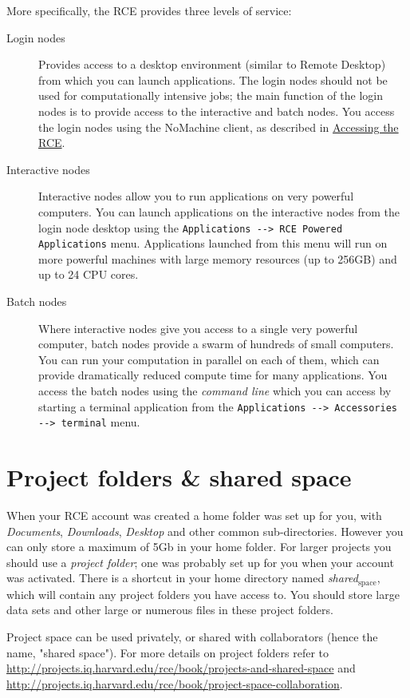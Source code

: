 \documentclass[11pt]{article}
\begin{document}
More specifically, the RCE provides three levels of service:
\begin{description}
\item[{Login nodes}] Provides access to a desktop environment (similar to Remote Desktop) from which you can launch applications. The login nodes should not be used for computationally intensive jobs; the main function of the login nodes is to provide access to the interactive and batch nodes. You access the login nodes using the NoMachine client, as described in \hyperref[sec:org16009a6]{Accessing the RCE}.
\item[{Interactive nodes}] Interactive nodes allow you to run applications on very powerful computers. You can launch applications on the interactive nodes from the login node desktop using the \texttt{Applications -{}-> RCE Powered Applications} menu. Applications launched from this menu will run on more powerful machines with large memory resources (up to 256GB) and up to 24 CPU cores.
\item[{Batch nodes}] Where interactive nodes give you access to a single very powerful computer, batch nodes provide a swarm of hundreds of small computers. You can run your computation in parallel on each of them, which can provide dramatically reduced compute time for many applications. You access the batch nodes using the \emph{command line} which you can access by starting a terminal application from the  \texttt{Applications -{}-> Accessories -{}-> terminal} menu.
\end{description}

\section{Project folders \& shared space}
\label{sec:orgfa75bf1}
When your RCE account was created a home folder was set up for you, with \emph{Documents}, \emph{Downloads}, \emph{Desktop} and other common sub-directories. However you can only store a maximum of 5Gb in your home folder. For larger projects you should use a \emph{project folder}; one was probably set up for you when your account was activated. There is a shortcut in your home directory named \emph{shared\(_{\text{space}}\)}, which will contain any project folders you have access to. You should store large data sets and other large or numerous files in these project folders.

Project space can be used privately, or shared with collaborators (hence the name, "shared space"). For more details on project folders refer to \url{http://projects.iq.harvard.edu/rce/book/projects-and-shared-space} and \url{http://projects.iq.harvard.edu/rce/book/project-space-collaboration}.
\end{document}
